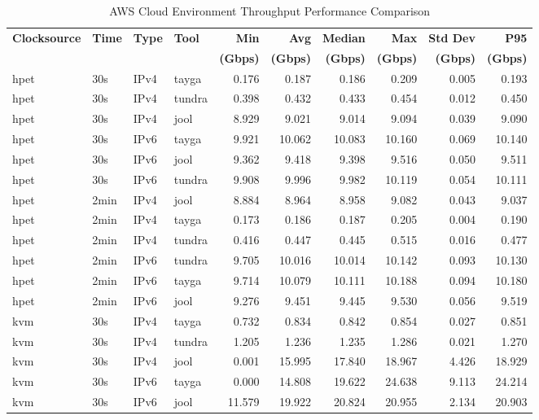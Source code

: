 \begin{table}[htbp]
\centering
\caption{AWS Cloud Environment Throughput Performance Comparison}
\label{tab:throughput_comparison_aws}
\footnotesize
\begin{tabular}{|l|l|l|l|r|r|r|r|r|r|}
\hline
\textbf{Clocksource} & \textbf{Time} & \textbf{Type} & \textbf{Tool} & \textbf{Min} & \textbf{Avg} & \textbf{Median} & \textbf{Max} & \textbf{Std Dev} & \textbf{P95} \\
 & & & & \textbf{(Gbps)} & \textbf{(Gbps)} & \textbf{(Gbps)} & \textbf{(Gbps)} & \textbf{(Gbps)} & \textbf{(Gbps)} \\
\hline
hpet & 30s & IPv4 & tayga & 0.176 & 0.187 & 0.186 & 0.209 & 0.005 & 0.193 \\
hpet & 30s & IPv4 & tundra & 0.398 & 0.432 & 0.433 & 0.454 & 0.012 & 0.450 \\
hpet & 30s & IPv4 & jool & 8.929 & 9.021 & 9.014 & 9.094 & 0.039 & 9.090 \\
hpet & 30s & IPv6 & tayga & 9.921 & 10.062 & 10.083 & 10.160 & 0.069 & 10.140 \\
hpet & 30s & IPv6 & jool & 9.362 & 9.418 & 9.398 & 9.516 & 0.050 & 9.511 \\
hpet & 30s & IPv6 & tundra & 9.908 & 9.996 & 9.982 & 10.119 & 0.054 & 10.111 \\
hpet & 2min & IPv4 & jool & 8.884 & 8.964 & 8.958 & 9.082 & 0.043 & 9.037 \\
hpet & 2min & IPv4 & tayga & 0.173 & 0.186 & 0.187 & 0.205 & 0.004 & 0.190 \\
hpet & 2min & IPv4 & tundra & 0.416 & 0.447 & 0.445 & 0.515 & 0.016 & 0.477 \\
hpet & 2min & IPv6 & tundra & 9.705 & 10.016 & 10.014 & 10.142 & 0.093 & 10.130 \\
hpet & 2min & IPv6 & tayga & 9.714 & 10.079 & 10.111 & 10.188 & 0.094 & 10.180 \\
hpet & 2min & IPv6 & jool & 9.276 & 9.451 & 9.445 & 9.530 & 0.056 & 9.519 \\
\hline
kvm & 30s & IPv4 & tayga & 0.732 & 0.834 & 0.842 & 0.854 & 0.027 & 0.851 \\
kvm & 30s & IPv4 & tundra & 1.205 & 1.236 & 1.235 & 1.286 & 0.021 & 1.270 \\
kvm & 30s & IPv4 & jool & 0.001 & 15.995 & 17.840 & 18.967 & 4.426 & 18.929 \\
kvm & 30s & IPv6 & tayga & 0.000 & 14.808 & 19.622 & 24.638 & 9.113 & 24.214 \\
kvm & 30s & IPv6 & jool & 11.579 & 19.922 & 20.824 & 20.955 & 2.134 & 20.903 \\

\end{tabular}
\end{table}
